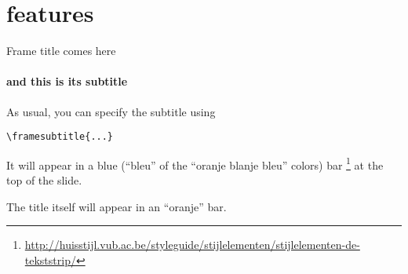 \documentclass{beamer}
\begin{document}
\section{features}

\begin{frame}[fragile]{Frame title comes here}
\framesubtitle{and this is its subtitle}
As usual, you can specify the subtitle using

\begin{verbatim}
\framesubtitle{...}
\end{verbatim}

It will appear in a blue (``bleu'' of the ``oranje blanje bleu'' colors) bar
\footnote{\url{http://huisstijl.vub.ac.be/styleguide/stijlelementen/stijlelementen-de-tekststrip/}}
at the top of the slide.

\smallskip

The title itself will appear in an ``oranje'' bar.
\end{frame}
\end{document}
